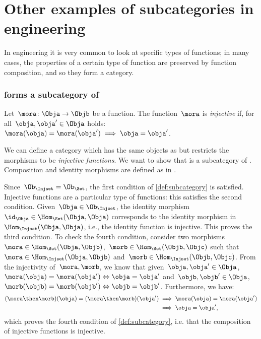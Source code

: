\section{Other examples of subcategories in engineering}

In engineering it is very common to look at specific types of functions; in many cases, the properties of a certain type of function are preserved by function composition, and so they form a category.

\subsubsection{\Injset forms a subcategory of \Set}
\begin{definition}
  \label{def:injective-function}
  Let~$\mora \colon \Obja\to \Objb$ be a function. The function~$\mora$ is \emph{injective} if, for all~$\obja,\obja'\in \Obja$ holds:~$\mora(\obja)=\mora(\obja')\implies \obja=\obja'$.
\end{definition}


\begin{example}
  We can define a category \iindex{\Injset} which has the same objects as \Set but restricts the morphisms to be \emph{injective functions}.
  We want to show that \Injset is a subcategory of \Set. Composition and identity morphisms are defined as in \Set.

  Since~$\Ob_{\Injset}=\Ob_{\Set}$, the first condition of \cref{def:subcategory} is satisfied. Injective functions are a particular type of functions: this satisfies the second condition. Given~$\Obja\in \Ob_{\Injset}$, the identity morphism~$\id_\Obja\in \Hom_{\Set}(\Obja,\Obja)$ corresponds to the identity morphism in~$\Hom_{\Injset}(\Obja,\Obja)$, i.e., the identity function is injective. This proves the third condition. To check the fourth condition, consider two morphisms~$\mora \in \Hom_\Set(\Obja,\Objb)$,~$\morb \in \Hom_\Set(\Objb,\Objc)$ such that~$\mora \in \Hom_\Injset(\Obja,\Objb)$ and~$\morb\in \Hom_\Injset(\Objb,\Objc)$. From the injectivity of~$\mora,\morb$, we know that given~$\obja,\obja'\in \Obja$, $\mora(\obja)=\mora(\obja') \Leftrightarrow \obja=\obja'$ and~$\objb,\objb'\in \Obja$,~$\morb(\objb)=\morb(\objb') \Leftrightarrow \objb=\objb'$. Furthermore, we have:
  \begin{equation*}
    \begin{aligned}
    (\mora\then \morb)(\obja)
      =(\mora \then \morb)(\obja')&\implies \mora(\obja)=\mora(\obja')\\
      &\implies \obja=\obja',
    \end{aligned}
  \end{equation*}
  which proves the fourth condition of \cref{def:subcategory}, i.e. that the composition of injective functions is injective.
\end{example}




